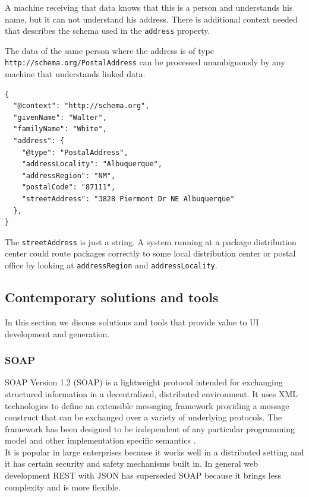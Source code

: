 A machine receiving that data knows that this is a person and understands his name, but it can not understand his address. There is additional context needed that describes the schema used in the \lstinline{address} property.

The data of the same person where the address is of type \lstinline{http://schema.org/PostalAddress} can be processed unambiguously by any machine that understands linked data.

\lstset{language=JSON}
\begin{lstlisting}[caption=A person with an address of type PostalAddress]
{
  "@context": "http://schema.org",
  "givenName": "Walter",
  "familyName": "White",
  "address": {
    "@type": "PostalAddress",
    "addressLocality": "Albuquerque",
    "addressRegion": "NM",
    "postalCode": "87111",
    "streetAddress": "3828 Piermont Dr NE Albuquerque"
  },
}
\end{lstlisting}

The \lstinline{streetAddress} is just a string. A system running at a package distribution center could route packages correctly to some local distribution center or postal office by looking at \lstinline{addressRegion} and \lstinline{addressLocality}.

\subsection{Contemporary solutions and tools}\label{sec:contemporarysolutions}
In this section we discuss solutions and tools that provide value to UI development and generation.

\subsubsection{SOAP}\label{sec:soap}
SOAP Version 1.2 (SOAP) is a lightweight protocol intended for exchanging structured information in a decentralized, distributed environment. It uses XML technologies to define an extensible messaging framework providing a message construct that can be exchanged over a variety of underlying protocols. The framework has been designed to be independent of any particular programming model and other implementation specific semantics \citep{soap}. \\
It is popular in large enterprises because it works well in a distributed setting and it has certain security and safety mechanisms built in. In general web development REST with JSON has superseded SOAP because it brings less complexity and is more flexible.

